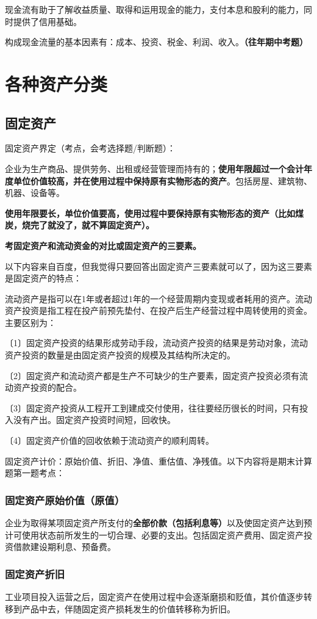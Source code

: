 现金流有助于了解收益质量、取得和运用现金的能力，支付本息和股利的能力，同时提供了信用基础。

构成现金流量的基本因素有：成本、投资、税金、利润、收入。\textbf{（往年期中考题）}

\section{各种资产分类}
\subsection{固定资产}
固定资产界定（考点，会考选择题/判断题）：

企业为生产商品、提供劳务、出租或经营管理而持有的；\textbf{使用年限超过一个会计年度单位价值较高，并在使用过程中保持原有实物形态的资产}。包括房屋、建筑物、机器、设备等。

\textbf{使用年限要长，单位价值要高，使用过程中要保持原有实物形态的资产（比如煤炭，烧完了就没了，就不算固定资产）。}

\textbf{考固定资产和流动资金的对比或固定资产的三要素。}

以下内容来自百度，但我觉得只要回答出固定资产三要素就可以了，因为这三要素是固定资产的特点：

流动资产是指可以在1年或者超过1年的一个经营周期内变现或者耗用的资产。流动资产投资是指工程在投产前预先垫付、在投产后生产经营过程中周转使用的资金。主要区别为：

〔1〕固定资产投资的结果形成劳动手段，流动资产投资的结果是劳动对象，流动资产投资的数量是由固定资产投资的规模及其结构所决定的。

〔2〕固定资产和流动资产都是生产不可缺少的生产要素，固定资产投资必须有流动资产投资的配合。

〔3〕固定资产投资从工程开工到建成交付使用，往往要经历很长的时间，只有投入没有产出。固定资产投资时间短，回收快。

〔4〕固定资产价值的回收依赖于流动资产的顺利周转。

固定资产计价：原始价值、折旧、净值、重估值、净残值。以下内容将是期末计算题第一题考点：

\subsubsection{固定资产原始价值（原值）}
企业为取得某项固定资产所支付的\textbf{全部价款（包括利息等）}以及使固定资产达到预计可使用状态前所发生的一切合理、必要的支出。包括固定资产费用、固定资产投资借款建设期利息、预备费。

\subsubsection{固定资产折旧}
工业项目投入运营之后，固定资产在使用过程中会逐渐磨损和贬值，其价值逐步转移到产品中去，伴随固定资产损耗发生的价值转移称为折旧。

